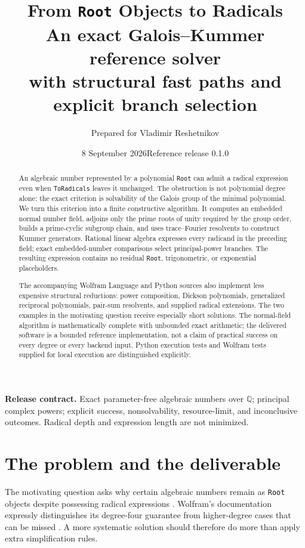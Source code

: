 \documentclass[11pt,a4paper]{article}
\title{\textbf{From \texttt{Root} Objects to Radicals}\\[5pt]
  \large An exact Galois--Kummer reference solver\\with structural fast paths and explicit branch selection}
\author{Prepared for Vladimir Reshetnikov}
\date{8 September 2026\quad\textbar\quad Reference release 0.1.0}
\newcommand{\Q}{\mathbb Q}
\theoremstyle{definition}
\begin{document}
\maketitle
\begin{abstract}
An algebraic number represented by a polynomial \texttt{Root} can admit a radical
expression even when \texttt{ToRadicals} leaves it unchanged. The obstruction is
not polynomial degree alone: the exact criterion is solvability of the Galois
group of the minimal polynomial. We turn this criterion into a finite constructive
algorithm. It computes an embedded normal number field, adjoins only the prime
roots of unity required by the group order, builds a prime-cyclic subgroup chain,
and uses trace--Fourier resolvents to construct Kummer generators. Rational linear
algebra expresses every radicand in the preceding field; exact embedded-number
comparisons select principal-power branches. The resulting expression contains
no residual \texttt{Root}, trigonometric, or exponential placeholders.

The accompanying Wolfram Language and Python sources also implement less
expensive structural reductions: power composition, Dickson polynomials,
generalized reciprocal polynomials, pair-sum resolvents, and supplied radical
extensions. The two examples in the motivating question receive especially short
solutions. The normal-field algorithm is mathematically complete with unbounded
exact arithmetic; the delivered software is a bounded reference implementation,
not a claim of practical success on every degree or every backend input. Python
execution tests and Wolfram tests supplied for local execution are distinguished
explicitly.
\end{abstract}
\vspace{4pt}
\noindent\textbf{Release contract.} Exact parameter-free algebraic numbers over
$\Q$; principal complex powers; explicit success, nonsolvability, resource-limit,
and inconclusive outcomes. Radical depth and expression length are not minimized.
\tableofcontents
\newpage

\section{The problem and the deliverable}
The motivating question asks why certain algebraic numbers remain as
\texttt{Root} objects despite possessing radical expressions \cite{question}.
Wolfram's documentation expressly distinguishes its degree-four guarantee from
higher-degree cases that can be missed \cite{toradicals}. A more systematic
solution should therefore do more than apply extra simplification rules.
\end{document}

